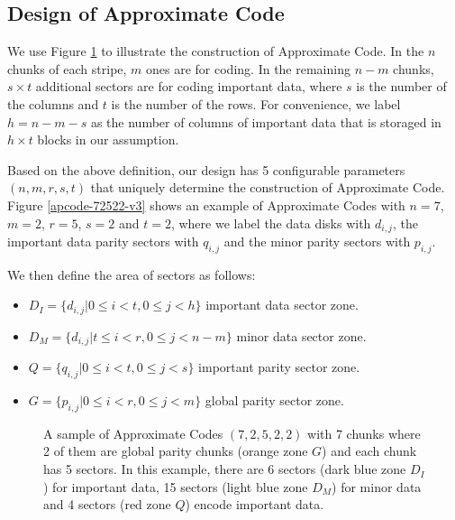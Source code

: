 \documentclass[sigconf]{acmart}
\begin{document}
\subsection{Design of Approximate Code}
We use Figure \ref{apcode-72522} to illustrate the construction of Approximate Code.
In the $n$ chunks of each stripe, $m$ ones are for coding.
In the remaining $n-m$ chunks, $s \times t$ additional sectors are for coding important data, where $s$ is the number of the columns and $t$ is the number of the rows.
For convenience, we label $h=n-m-s$ as the number of columns of important data that is storaged in $h \times t$ blocks in our assumption.

Based on the above definition, our design has 5 configurable parameters $(n, m, r, s,t)$ that uniquely determine the construction of Approximate Code.
Figure \ref{apcode-72522-v3} shows an example of Approximate Codes with $n = 7$, $m = 2$, $r=5$, $s=2$ and $t = 2$, where we label the data disks with $d_{i,j}$, the important data parity sectors with $q_{i,j}$ and the minor parity sectors with $p_{i,j}$.

We then define the area of sectors as follows:
\begin{itemize}
    \item $D_I=\{d_{i,j}|0\leqslant i < t, 0\leqslant j < h \}$ important data sector zone.
    \item $D_M=\{d_{i,j}|t\leqslant i < r, 0\leqslant j < n-m \}$ minor data sector zone.
    \item $Q=\{q_{i,j}|0\leqslant i < t, 0\leqslant j < s \}$ important parity sector zone. 
    \item $G=\{p_{i,j}|0\leqslant i < r, 0\leqslant j < m \}$ global parity sector zone.
\end{itemize}

\begin{figure}[h]
\centering
{}
\caption{A sample of Approximate Codes $(7,2,5,2,2)$ with 7 chunks where 2 of them are global parity chunks (orange zone $G$) and each chunk has 5 sectors. In this example, there are 6 sectors (dark blue zone $D_I$) for important data, 15 sectors (light blue zone $D_M$) for minor data and 4 sectors (red zone $Q$) encode important data.}
\label{apcode-72522}
\end{figure}
\end{document}
